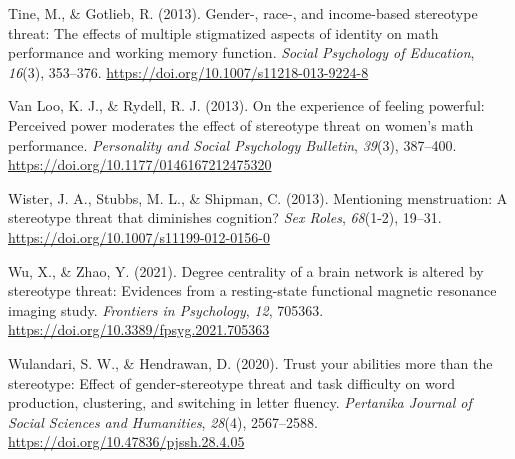 \documentclass[
  doc, a4paper]{apa7}
\newlength{\cslhangindent}
\newenvironment{CSLReferences}[2] %
 {\begin{list}{}{%
  \setlength{\itemindent}{0pt}
  \setlength{\leftmargin}{0pt}
  \setlength{\parsep}{0pt}
  \ifodd #1
   \setlength{\leftmargin}{\cslhangindent}
   \setlength{\itemindent}{-1\cslhangindent}
  \fi
  \setlength{\itemsep}{#2\baselineskip}}}
 {\end{list}}
\begin{document}
\begin{CSLReferences}{1}{0}
Tine, M., \& Gotlieb, R. (2013). Gender-, race-, and income-based stereotype threat: The effects of multiple stigmatized aspects of identity on math performance and working memory function. \emph{Social Psychology of Education}, \emph{16}(3), 353--376. \url{https://doi.org/10.1007/s11218-013-9224-8}

Van Loo, K. J., \& Rydell, R. J. (2013). On the experience of feeling powerful: {Perceived} power moderates the effect of stereotype threat on women's math performance. \emph{Personality and Social Psychology Bulletin}, \emph{39}(3), 387--400. \url{https://doi.org/10.1177/0146167212475320}

Wister, J. A., Stubbs, M. L., \& Shipman, C. (2013). Mentioning menstruation: A stereotype threat that diminishes cognition? \emph{Sex Roles}, \emph{68}(1-2), 19--31. \url{https://doi.org/10.1007/s11199-012-0156-0}

Wu, X., \& Zhao, Y. (2021). Degree centrality of a brain network is altered by stereotype threat: {Evidences} from a resting-state functional magnetic resonance imaging study. \emph{Frontiers in Psychology}, \emph{12}, 705363. \url{https://doi.org/10.3389/fpsyg.2021.705363}

Wulandari, S. W., \& Hendrawan, D. (2020). Trust your abilities more than the stereotype: {Effect} of gender-stereotype threat and task difficulty on word production, clustering, and switching in letter fluency. \emph{Pertanika Journal of Social Sciences and Humanities}, \emph{28}(4), 2567--2588. \url{https://doi.org/10.47836/pjssh.28.4.05}

\end{CSLReferences}
\end{document}
